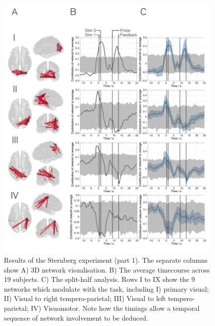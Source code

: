 	\begin{figure}[h!]
		\begin{center}
			\includegraphics[width=\linewidth]{./images/chapter6/figure_3a.png}
			\caption{Results of the Sternberg experiment (part 1). The separate columns show A) 3D network visualisation. B) The average timecourse across 19 subjects. C) The split-half analysis. Rows I to IX show the 9 networks which modulate with the task, including I) primary visual; II) Visual to right tempero-parietal; III) Visual to left tempero-parietal; IV) Visuomotor. Note how the timings allow a temporal sequence of network involvement to be deduced.
		    \label{fig_6_3a}}
		\end{center}
	\end{figure}
	
